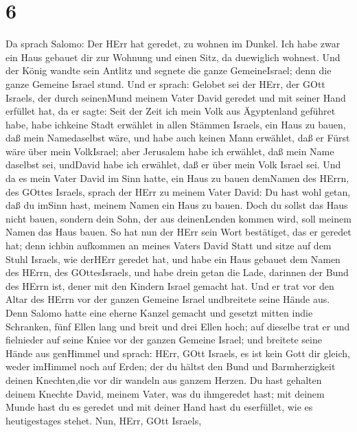 \hypertarget{section-5}{%
\section{6}\label{section-5}}

 Da sprach Salomo: Der HErr hat geredet, zu wohnen im
Dunkel.  Ich habe zwar ein Haus gebauet dir zur Wohnung und
einen Sitz, da duewiglich wohnest.  Und der König wandte
sein Antlitz und segnete die ganze GemeineIsrael; denn die ganze Gemeine
Israel stund.  Und er sprach: Gelobet sei der HErr, der GOtt
Israels, der durch seinenMund meinem Vater David geredet und mit seiner
Hand erfüllet hat, da er sagte:  Seit der Zeit ich mein Volk
aus Ägyptenland geführet habe, habe ichkeine Stadt erwählet in allen
Stämmen Israels, ein Haus zu bauen, daß mein Namedaselbst wäre, und habe
auch keinen Mann erwählet, daß er Fürst wäre über mein VolkIsrael;
 aber Jerusalem habe ich erwählet, daß mein Name daselbst
sei, undDavid habe ich erwählet, daß er über mein Volk Israel sei.
 Und da es mein Vater David im Sinn hatte, ein Haus zu bauen
demNamen des HErrn, des GOttes Israels,  sprach der HErr zu
meinem Vater David: Du hast wohl getan, daß du imSinn hast, meinem Namen
ein Haus zu bauen.  Doch du sollst das Haus nicht bauen,
sondern dein Sohn, der aus deinenLenden kommen wird, soll meinem Namen
das Haus bauen.  So hat nun der HErr sein Wort bestätiget,
das er geredet hat; denn ichbin aufkommen an meines Vaters David Statt
und sitze auf dem Stuhl Israels, wie derHErr geredet hat, und habe ein
Haus gebauet dem Namen des HErrn, des GOttesIsraels,  und
habe drein getan die Lade, darinnen der Bund des HErrn ist, dener mit
den Kindern Israel gemacht hat.  Und er trat vor den Altar
des HErrn vor der ganzen Gemeine Israel undbreitete seine Hände aus.
 Denn Salomo hatte eine eherne Kanzel gemacht und gesetzt
mitten indie Schranken, fünf Ellen lang und breit und drei Ellen hoch;
auf dieselbe trat er und fielnieder auf seine Kniee vor der ganzen
Gemeine Israel; und breitete seine Hände aus genHimmel  und
sprach: HErr, GOtt Israels, es ist kein Gott dir gleich, weder imHimmel
noch auf Erden; der du hältst den Bund und Barmherzigkeit deinen
Knechten,die vor dir wandeln aus ganzem Herzen.  Du hast
gehalten deinem Knechte David, meinem Vater, was du ihmgeredet hast; mit
deinem Munde hast du es geredet und mit deiner Hand hast du eserfüllet,
wie es heutigestages stehet.  Nun, HErr, GOtt Israels,
